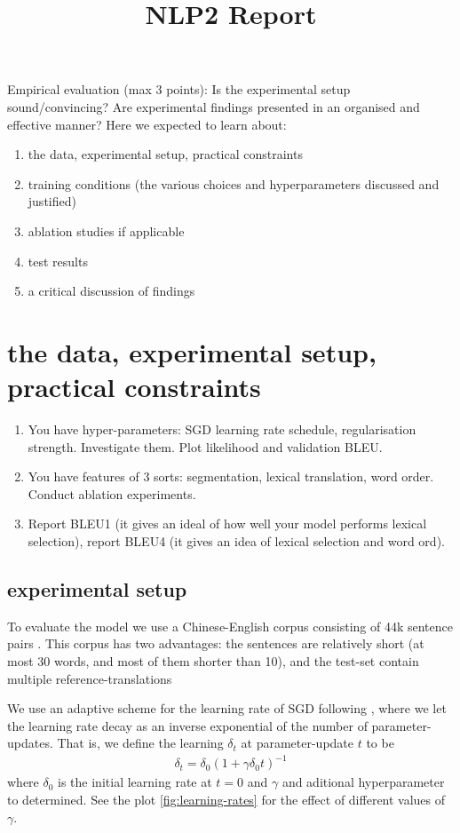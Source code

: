\documentclass[11pt, a4paper]{article}
\title{NLP2 Report}
\begin{document}
\maketitle
Empirical evaluation (max 3 points): Is the experimental setup sound/convincing? Are experimental findings presented in an organised and effective manner? Here we expected to learn about:
\begin{enumerate}
	\item the data, experimental setup, practical constraints
	\item training conditions (the various choices and hyperparameters discussed and justified)
	\item ablation studies if applicable
	\item test results
	\item a critical discussion of findings
\end{enumerate}

\section{the data, experimental setup, practical constraints}

\begin{enumerate}
	\item You have hyper-parameters: SGD learning rate schedule, regularisation strength. Investigate them. Plot likelihood and validation BLEU.
	\item You have features of 3 sorts: segmentation, lexical translation, word order. Conduct ablation experiments.
	\item Report BLEU1 (it gives an ideal of how well your model performs lexical selection), report BLEU4 (it gives an idea of lexical selection and word ord).
\end{enumerate}

\subsection{experimental setup}

To evaluate the model we use a Chinese-English corpus consisting of 44k sentence pairs \cite{takezawa}. This corpus has two advantages: the sentences are relatively short (at most 30 words, and most of them shorter than 10), and the test-set contain multiple reference-translations \cite{takezawa}


We use an adaptive scheme for the learning rate of SGD following \cite{bottou}, where we let the learning rate decay as an inverse exponential of the number of parameter-updates. That is, we define the learning $\delta_t$ at parameter-update $t$ to be
\begin{align*}
\delta_t = \delta_0 (1 + \gamma\delta_0 t)^{-1}
\end{align*}
where $\delta_0$ is the initial learning rate at $t=0$ and $\gamma$ and aditional hyperparameter to determined. See the plot \ref{fig:learning-rates} for the effect of different values of $\gamma$.
\end{document}

